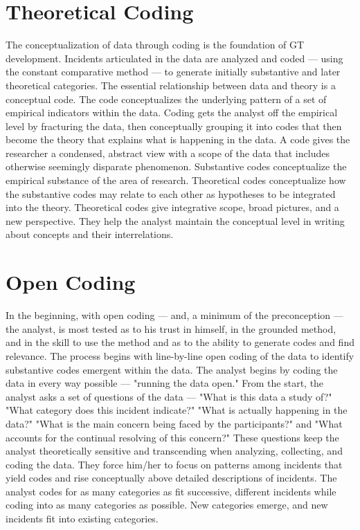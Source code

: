 \section*{Theoretical Coding}

The conceptualization of data through coding is the foundation of GT development. 
Incidents articulated in the data are analyzed and coded --- using the constant comparative method --- to generate initially substantive and later theoretical categories. 
The essential relationship between data and theory is a conceptual code. The code conceptualizes the underlying pattern of a set of empirical indicators within the data. 
Coding gets the analyst off the empirical level by fracturing the data, then conceptually grouping it into codes that then become the theory that explains what is happening in the data. 
A code gives the researcher a condensed, abstract view with a scope of the data that includes otherwise seemingly disparate phenomenon. 
Substantive codes conceptualize the empirical substance of the area of research. 
Theoretical codes conceptualize how the substantive codes may relate to each other as hypotheses to be integrated into the theory. 
Theoretical codes give integrative scope, broad pictures, and a new perspective. 
They help the analyst maintain the conceptual level in writing about concepts and their interrelations.

\section*{Open Coding}

In the beginning, with open coding --- and, a minimum of the preconception --- the analyst, is most tested as to his trust in himself, in the grounded method, and in the skill to use the method and as to the ability to generate codes and find relevance. 
The process begins with line-by-line open coding of the data to
identify substantive codes emergent within the data. 
The analyst begins by coding the data in every way possible --- "running the data open."
From the start, the analyst asks a set of questions of the data --- "What is this data a study of?"
"What category does this incident indicate?"
"What is actually happening in the data?" 
"What is the main concern being faced by the participants?" 
and 
"What accounts for the continual resolving of this concern?" 
These questions keep the analyst theoretically sensitive and transcending when analyzing, collecting, and coding the data. 
They force him/her to focus on patterns among incidents that yield codes and rise conceptually above detailed descriptions of incidents. 
The analyst codes for as many categories as fit successive, different incidents while coding into as many categories as possible. 
New categories emerge, and new incidents fit into existing categories.


